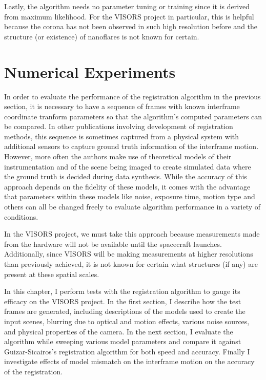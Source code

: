 \documentclass[tocnosub,noragright,centerchapter,12pt]{uiucecethesis09}
\begin{document}
Lastly, the algorithm needs no parameter tuning or training since it is derived from maximum likelihood.  For the VISORS project in particular, this is helpful because the corona has not been observed in such high resolution before and the structure (or existence) of nanoflares is not known for certain.


\chapter{Numerical Experiments} \label{chap:experiments}

In order to evaluate the performance of the registration algorithm in the previous section, it is necessary to have a sequence of frames with known interframe coordinate tranform parameters so that the algorithm's computed parameters can be compared.  In other publications involving development of registration methods, this sequence is sometimes captured from a physical system with additional sensors to capture ground truth information of the interframe motion.  However, more often the authors make use of theoretical models of their instrumentation and of the scene being imaged to create simulated data where the ground truth is decided during data synthesis.  While the accuracy of this approach depends on the fidelity of these models, it comes with the advantage that parameters within these models like noise, exposure time, motion type and others can all be changed freely to evaluate algorithm performance in a variety of conditions.

In the VISORS project, we must take this approach because measurements made from the hardware will not be available until the spacecraft launches.  Additionally, since VISORS will be making measurements at higher resolutions than previously achieved, it is not known for certain what structures (if any) are present at these spatial scales.

In this chapter, I perform tests with the registration algorithm to gauge its efficacy on the VISORS project.  In the first section, I describe how the test frames are generated, including descriptions of the models used to create the input scenes, blurring due to optical and motion effects, various noise sources, and physical properties of the camera.  In the next section, I evaluate the algorithm while sweeping various model parameters and compare it against Guizar-Sicairos's registration algorithm for both speed and accuracy.  Finally I investigate effects of model mismatch on the interframe motion on the accuracy of the registration.
\end{document}

